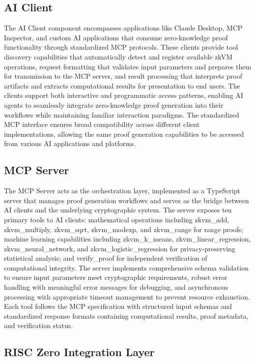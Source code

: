 \documentclass[11pt]{article}
\begin{document}
\subsection{AI Client}


The AI Client component encompasses applications like Claude Desktop, MCP Inspector, and custom AI applications that consume zero-knowledge proof functionality through standardized MCP protocols. These clients provide tool discovery capabilities that automatically detect and register available zkVM operations, request formatting that validates input parameters and prepares them for transmission to the MCP server, and result processing that interprets proof artifacts and extracts computational results for presentation to end users. The clients support both interactive and programmatic access patterns, enabling AI agents to seamlessly integrate zero-knowledge proof generation into their workflows while maintaining familiar interaction paradigms. The standardized MCP interface ensures broad compatibility across different client implementations, allowing the same proof generation capabilities to be accessed from various AI applications and platforms.

\subsection{MCP Server}

The MCP Server acts as the orchestration layer, implemented as a TypeScript server that manages proof generation workflows and serves as the bridge between AI clients and the underlying cryptographic system. The server exposes ten primary tools to AI clients: mathematical operations including zkvm\_add, zkvm\_multiply, zkvm\_sqrt, zkvm\_modexp, and zkvm\_range for range proofs; machine learning capabilities including zkvm\_k\_means, zkvm\_linear\_regression, zkvm\_neural\_network, and zkvm\_logistic\_regression for privacy-preserving statistical analysis; and verify\_proof for independent verification of computational integrity. The server implements comprehensive schema validation to ensure input parameters meet cryptographic requirements, robust error handling with meaningful error messages for debugging, and asynchronous processing with appropriate timeout management to prevent resource exhaustion. Each tool follows the MCP specification with structured input schemas and standardized response formats containing computational results, proof metadata, and verification status.

\subsection{RISC Zero Integration Layer}
\end{document}

